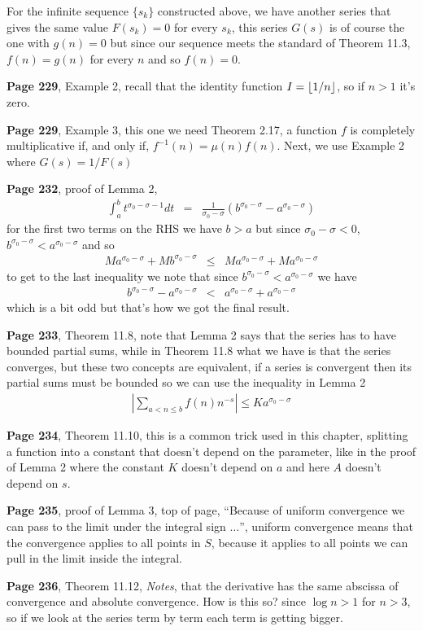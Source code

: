 \documentclass[aps,preprint,preprintnumbers,nofootinbib,showpacs,prd]{revtex4-1}
\newcommand{\nbea}{\begin{eqnarray*}}
\newcommand{\neea}{\end{eqnarray*}}
\DeclarePairedDelimiter{\floor}{\lfloor}{\rfloor}
\begin{document}
For the infinite sequence $\{s_k\}$ constructed above, we have another series that gives the same value $F(s_k) = 0$ for every $s_k$, this series $G(s)$ is of course the one with $g(n) = 0$ but since our sequence meets the standard of Theorem 11.3, $f(n) = g(n)$ for every $n$ and so $f(n) = 0$.

{\bf Page 229}, Example 2, recall that the identity function $I = \floor{1/n}$, so if $n > 1$ it's zero.

{\bf Page 229}, Example 3, this one we need Theorem 2.17, a function $f$ is completely multiplicative if, and only if, $f^{-1}(n) = \mu(n)f(n)$. Next, we use Example 2 where $G(s) = 1/F(s)$

{\bf Page 232}, proof of Lemma 2, 
%
\nbea
\int_a^b t^{\sigma_0-\sigma - 1} dt & = & \frac{1}{\sigma_0 - \sigma} (b^{\sigma_0-\sigma} -  a^{\sigma_0-\sigma})
\neea
%
for the first two terms on the RHS we have $b > a$ but since $\sigma_0 - \sigma < 0$, $b^{\sigma_0 - \sigma} < a^{\sigma_0 - \sigma}$ and so
%
\nbea
Ma^{\sigma_0 - \sigma} + Mb^{\sigma_0 - \sigma} & \le & Ma^{\sigma_0 - \sigma} + Ma^{\sigma_0 - \sigma}
\neea
%
to get to the last inequality we note that since $b^{\sigma_0 - \sigma} < a^{\sigma_0 - \sigma}$ we have
%
\nbea
b^{\sigma_0 - \sigma} - a^{\sigma_0 - \sigma} & < & a^{\sigma_0 - \sigma} + a^{\sigma_0 - \sigma}
\neea
%
which is a bit odd but that's how we got the final result.

{\bf Page 233}, Theorem 11.8, note that Lemma 2 says that the series has to have bounded partial sums, while in Theorem 11.8 what we have is that the series converges, but these two concepts are equivalent, if a series is convergent then its partial sums must be bounded so we can use the inequality in Lemma 2
%
\nbea
\left|\sum_{a < n \le b} f(n)n^{-s}\right| \le Ka^{\sigma_0-\sigma}
\neea
%

{\bf Page 234}, Theorem 11.10, this is a common trick used in this chapter, splitting a function into a constant that doesn't depend on the parameter, like in the proof of Lemma 2 where the constant $K$ doesn't depend on $a$ and here $A$ doesn't depend on $s$.

{\bf Page 235}, proof of Lemma 3, top of page, ``Because of uniform convergence we can pass to the limit under the integral sign $\dots$'', uniform convergence means that the convergence applies to all points in $S$, because it applies to all points we can pull in the limit inside the integral.

{\bf Page 236}, Theorem 11.12, {\it Notes}, that the derivative has the same abscissa of convergence and absolute convergence. How is this so? since $\log n > 1$ for $n > 3$, so if we look at the series term by term each term is getting bigger.
\end{document}
